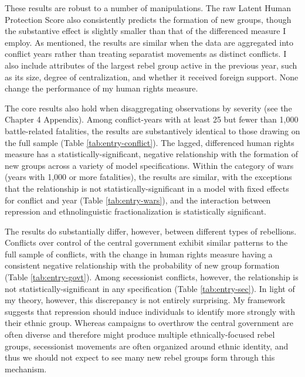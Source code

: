 \documentclass[12pt,]{book}
\theoremstyle{definition}
\theoremstyle{definition}
\theoremstyle{definition}
\theoremstyle{remark}
\begin{document}
These results are robust to a number of manipulations. The raw Latent
Human Protection Score also consistently predicts the formation of new
groups, though the substantive effect is slightly smaller than that of
the differenced measure I employ. As mentioned, the results are similar
when the data are aggregated into conflict years rather than treating
separatist movements as distinct conflicts. I also include attributes of
the largest rebel group active in the previous year, such as its size,
degree of centralization, and whether it received foreign support. None
change the performance of my human rights measure.

The core results also hold when disaggregating observations by severity
(see the Chapter 4 Appendix). Among conflict-years with at least 25 but
fewer than 1,000 battle-related fatalities, the results are
substantively identical to those drawing on the full sample (Table
\ref{tab:entry-conflict}). The lagged, differenced human rights measure
has a statistically-significant, negative relationship with the
formation of new groups across a variety of model specifications. Within
the category of wars (years with 1,000 or more fatalities), the results
are similar, with the exceptions that the relationship is not
statistically-significant in a model with fixed effects for conflict and
year (Table \ref{tab:entry-wars}), and the interaction between
repression and ethnolinguistic fractionalization is statistically
significant.

The results do substantially differ, however, between different types of
rebellions. Conflicts over control of the central government exhibit
similar patterns to the full sample of conflicts, with the change in
human rights measure having a consistent negative relationship with the
probability of new group formation (Table \ref{tab:entry-govt}). Among
secessionist conflicts, however, the relationship is not
statistically-significant in any specification (Table
\ref{tab:entry-sec}). In light of my theory, however, this discrepancy
is not entirely surprising. My framework suggests that repression should
induce individuals to identify more strongly with their ethnic group.
Whereas campaigns to overthrow the central government are often diverse
and therefore might produce multiple ethnically-focused rebel groups,
secessionist movements are often organized around ethnic identity, and
thus we should not expect to see many new rebel groups form through this
mechanism.
\end{document}
